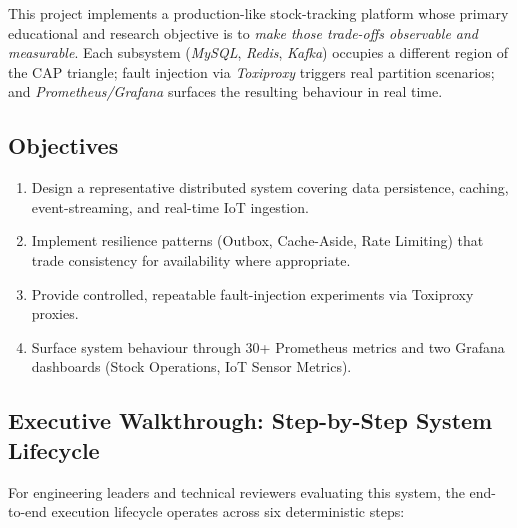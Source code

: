 \documentclass[12pt,a4paper,twoside]{article}
\newcommand{\tech}[1]{\textit{#1}}
\begin{document}
This project implements a production-like stock-tracking platform whose
primary educational and research objective is to \emph{make those
trade-offs observable and measurable}.
Each subsystem (\tech{MySQL}, \tech{Redis}, \tech{Kafka}) occupies a
different region of the CAP triangle; fault injection via
\tech{Toxiproxy} triggers real partition scenarios; and
\tech{Prometheus/Grafana} surfaces the resulting behaviour in real time.

\subsection{Objectives}
\begin{enumerate}[leftmargin=1.8cm, label=\textbf{O\arabic*.}]
  \item Design a representative distributed system covering data persistence,
        caching, event-streaming, and real-time IoT ingestion.
  \item Implement resilience patterns (Outbox, Cache-Aside, Rate Limiting)
        that trade consistency for availability where appropriate.
  \item Provide controlled, repeatable fault-injection experiments via
        Toxiproxy proxies.
  \item Surface system behaviour through 30+ Prometheus metrics and two
        Grafana dashboards (Stock Operations, IoT Sensor Metrics).
\end{enumerate}

\subsection{Executive Walkthrough: Step-by-Step System Lifecycle}

For engineering leaders and technical reviewers evaluating this system, the end-to-end execution lifecycle operates across six deterministic steps:
\end{document}
